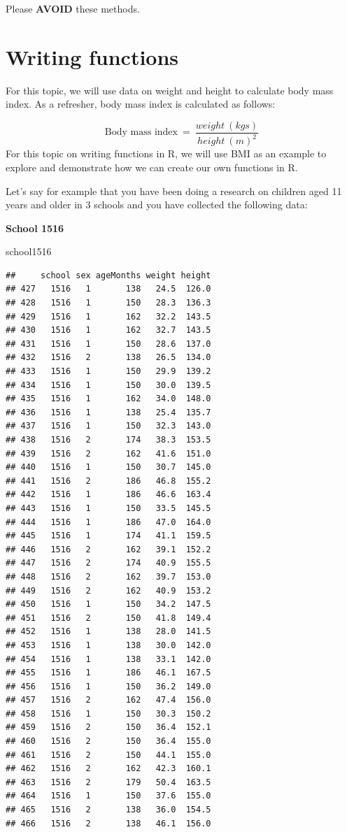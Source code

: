 \documentclass[
  12pt,
]{book}
\newenvironment{Shaded}{\begin{snugshade}}{\end{snugshade}}
\newcommand{\NormalTok}[1]{#1}
\begin{document}
Please \textbf{AVOID} these methods.

\hypertarget{write-functions}{%
\chapter{Writing functions}\label{write-functions}}

For this topic, we will use data on weight and height to calculate body mass index. As a refresher, body mass index is calculated as follows:

\[ \text{Body mass index} ~=~ \frac{weight ~ (kgs)}{height ~ (m) ^ 2} \]
For this topic on writing functions in R, we will use BMI as an example to explore and demonstrate how we can create our own functions in R.

Let's say for example that you have been doing a research on children aged 11 years and older in 3 schools and you have collected the following data:

\textbf{School 1516}

\begin{Shaded}
\begin{Highlighting}[]
\NormalTok{school1516}
\end{Highlighting}
\end{Shaded}

\begin{verbatim}
##     school sex ageMonths weight height
## 427   1516   1       138   24.5  126.0
## 428   1516   1       150   28.3  136.3
## 429   1516   1       162   32.2  143.5
## 430   1516   1       162   32.7  143.5
## 431   1516   1       150   28.6  137.0
## 432   1516   2       138   26.5  134.0
## 433   1516   1       150   29.9  139.2
## 434   1516   1       150   30.0  139.5
## 435   1516   1       162   34.0  148.0
## 436   1516   1       138   25.4  135.7
## 437   1516   1       150   32.3  143.0
## 438   1516   2       174   38.3  153.5
## 439   1516   2       162   41.6  151.0
## 440   1516   1       150   30.7  145.0
## 441   1516   2       186   46.8  155.2
## 442   1516   1       186   46.6  163.4
## 443   1516   1       150   33.5  145.5
## 444   1516   1       186   47.0  164.0
## 445   1516   1       174   41.1  159.5
## 446   1516   2       162   39.1  152.2
## 447   1516   2       174   40.9  155.5
## 448   1516   2       162   39.7  153.0
## 449   1516   2       162   40.9  153.2
## 450   1516   1       150   34.2  147.5
## 451   1516   2       150   41.8  149.4
## 452   1516   1       138   28.0  141.5
## 453   1516   1       138   30.0  142.0
## 454   1516   1       138   33.1  142.0
## 455   1516   1       186   46.1  167.5
## 456   1516   1       150   36.2  149.0
## 457   1516   2       162   47.4  156.0
## 458   1516   1       150   30.3  150.2
## 459   1516   2       150   36.4  152.1
## 460   1516   2       150   36.4  155.0
## 461   1516   2       150   44.1  155.0
## 462   1516   2       162   42.3  160.1
## 463   1516   2       179   50.4  163.5
## 464   1516   1       150   37.6  155.0
## 465   1516   2       138   36.0  154.5
## 466   1516   2       138   46.1  156.0
\end{verbatim}
\end{document}
